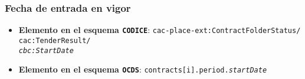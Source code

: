         \subsubsection{Fecha de entrada en vigor}
            \begin{itemize}
                \item \textbf{Elemento en el esquema \texttt{CODICE}}:
                    \tabto{7.6cm} \texttt{cac-place-ext:ContractFolderStatus/} \\
                    \tabto{7.6cm} \texttt{cac:TenderResult/} \\
                    \tabto{7.6cm} \texttt{\textit{cbc:StartDate}}
                \item \textbf{Elemento en el esquema \texttt{OCDS}}:
                    \tabto{7.6cm} \texttt{contracts[i].period.\textit{startDate}}
            \end{itemize}
            
\newpage